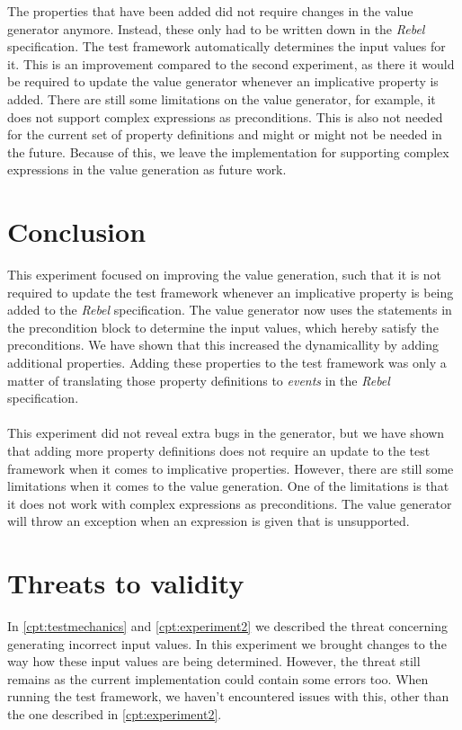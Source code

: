 The properties that have been added did not require changes in the value
generator anymore. Instead, these only had to be written down in the \textit{Rebel}
specification. The test framework automatically determines the input values for it.
This is an improvement compared to the second experiment, as there it would be
required to update the value generator whenever an implicative property is
added. There are still some limitations on the value generator, for example, it
does not support complex expressions as preconditions. This is also not needed
for the current set of property definitions and might or might not be needed in
the future. Because of this, we leave the implementation for supporting complex
expressions in the value generation as future work.

\section{Conclusion}
This experiment focused on improving the value generation, such that it is not
required to update the test framework whenever an implicative property is being
added to the \textit{Rebel} specification. The value generator now uses the
statements in the precondition block to determine the input values, which hereby
satisfy the preconditions. We have shown that this increased the dynamicallity
by adding additional properties. Adding these properties to the test
framework was only a matter of translating those property definitions to \textit{events} in the
\textit{Rebel} specification.\\
\\
This experiment did not reveal extra bugs in the generator, but we have shown
that adding more property definitions does not require an update to the test
framework when it comes to implicative properties. However, there are still some
limitations when it comes to the value generation. One of the limitations is
that it does not work with complex expressions as preconditions. The value
generator will throw an exception when an expression is given that is
unsupported.

\section{Threats to validity}
In \autoref{cpt:testmechanics} and \autoref{cpt:experiment2} we described the threat concerning generating incorrect input values. In this experiment we brought changes to the way how these input values are being determined. However, the threat still remains as the current implementation could contain some errors too. When running the test framework, we haven't encountered issues with this, other than the one described in \autoref{cpt:experiment2}.
